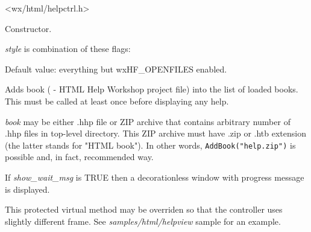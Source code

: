 <wx/html/helpctrl.h>


\label{wxhtmlhelpcontrollerwxhtmlhelpcontroller}


Constructor.


{\it style} is combination of these flags:

\begin{twocollist}\itemsep=0pt
\end{twocollist}

Default value: everything but wxHF\_OPENFILES enabled.

\label{wxhtmlhelpcontrolleraddbook}


Adds book ( - HTML Help Workshop project file) into the list of loaded books.
This must be called at least once before displaying  any help.

{\it book} may be either .hhp file or ZIP archive that contains arbitrary number of .hhp files in 
top-level directory. This ZIP archive must have .zip or .htb extension
(the latter stands for "HTML book"). In other words, {\tt AddBook("help.zip")} is possible and, in fact,
recommended way.

If {\it show\_wait\_msg} is TRUE then a decorationless window with progress message is displayed.

\label{wxhtmlhelpcontrollercreatehelpframe}


This protected virtual method may be overriden so that the controller
uses slightly different frame. See {\it samples/html/helpview} sample for
an example.
\label{wxhtmlhelpcontrollerdisplay}

